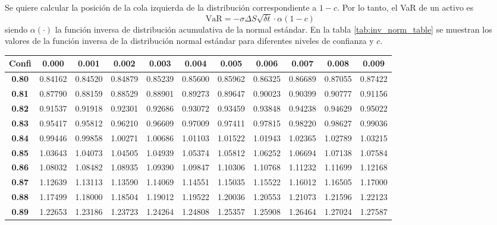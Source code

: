 Se quiere calcular la posición de la cola izquierda de la distribución correspondiente a $1-c$. Por lo tanto, el VaR de un activo es
\[
    \boxed{\text{VaR} = -\sigma \Delta S \sqrt{\delta t} \cdot \alpha(1-c)}
\]
siendo $\alpha(\cdot)$ la función inversa de distribución acumulativa de la normal estándar. En la tabla \ref{tab:inv_norm_table} se muestran los valores de la función inversa de la distribución normal estándar para diferentes niveles de confianza y $c$.
\begin{table}[H]
    \centering
    \small
    \begin{tabular}{|c|c|c|c|c|c|c|c|c|c|c|}
        \hline
        \textbf{Confi} & \textbf{0.000} & \textbf{0.001} & \textbf{0.002} & \textbf{0.003} & \textbf{0.004} & \textbf{0.005} & \textbf{0.006} & \textbf{0.007} & \textbf{0.008} & \textbf{0.009} \\
        \hline
        \textbf{0.80} & 0.84162 & 0.84520 & 0.84879 & 0.85239 & 0.85600 & 0.85962 & 0.86325 & 0.86689 & 0.87055 & 0.87422 \\
        \hline
        \textbf{0.81} & 0.87790 & 0.88159 & 0.88529 & 0.88901 & 0.89273 & 0.89647 & 0.90023 & 0.90399 & 0.90777 & 0.91156 \\
        \hline
        \textbf{0.82} & 0.91537 & 0.91918 & 0.92301 & 0.92686 & 0.93072 & 0.93459 & 0.93848 & 0.94238 & 0.94629 & 0.95022 \\
        \hline
        \textbf{0.83} & 0.95417 & 0.95812 & 0.96210 & 0.96609 & 0.97009 & 0.97411 & 0.97815 & 0.98220 & 0.98627 & 0.99036 \\
        \hline
        \textbf{0.84} & 0.99446 & 0.99858 & 1.00271 & 1.00686 & 1.01103 & 1.01522 & 1.01943 & 1.02365 & 1.02789 & 1.03215 \\
        \hline
        \textbf{0.85} & 1.03643 & 1.04073 & 1.04505 & 1.04939 & 1.05374 & 1.05812 & 1.06252 & 1.06694 & 1.07138 & 1.07584 \\
        \hline
        \textbf{0.86} & 1.08032 & 1.08482 & 1.08935 & 1.09390 & 1.09847 & 1.10306 & 1.10768 & 1.11232 & 1.11699 & 1.12168 \\
        \hline
        \textbf{0.87} & 1.12639 & 1.13113 & 1.13590 & 1.14069 & 1.14551 & 1.15035 & 1.15522 & 1.16012 & 1.16505 & 1.17000 \\
        \hline
        \textbf{0.88} & 1.17499 & 1.18000 & 1.18504 & 1.19012 & 1.19522 & 1.20036 & 1.20553 & 1.21073 & 1.21596 & 1.22123 \\
        \hline
        \textbf{0.89} & 1.22653 & 1.23186 & 1.23723 & 1.24264 & 1.24808 & 1.25357 & 1.25908 & 1.26464 & 1.27024 & 1.27587 \\

\end{tabular}
\end{table}
